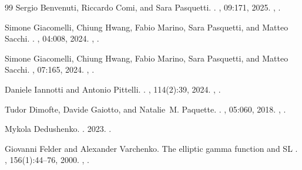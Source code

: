 \documentclass[11pt,a4paper]{article}
\makeatletter
\numberwithin{equation}{section}
\theoremstyle{plain}
\theoremstyle{definition}
\theoremstyle{remark}
\newcounter{mathrecordid}
\newcommand{\mathboxbegin}[1]{%
  \stepcounter{mathrecordid}%
  \immediate\write\mathrecords{\themathrecordid,#1}%
  \special{pdf:bann << /Type /Annot /Subtype /Link /Border [0 0 0]
    /MathBoxID \themathrecordid /F 2
    /A << /S /URI /URI (urn:mathbox:\themathrecordid) >> >>}}
\newcommand{\mathboxinlineplain}[1]{$#1$}
\newcommand{\mathboxinline}[1]{%
  $\mathboxbegin{inline}#1\special{pdf:eann}$}
\newcommand{\recordmath}{%
  \ifmeasuring@\expandafter\mathboxinlineplain
  \else\expandafter\mathboxinline\fi}
\makeatother
\begin{document}
\begin{thebibliography}{99}
Sergio Benvenuti, Riccardo Comi, and Sara Pasquetti.
.
, 09:171, 2025.
\newblock \href {https://arxiv.org/abs/2410.19049} {},
  \href {https://doi.org/10.1007/JHEP09(2025)171}
  {}.

Simone Giacomelli, Chiung Hwang, Fabio Marino, Sara Pasquetti, and Matteo
  Sacchi.
.
, 04:008, 2024.
\newblock \href {https://arxiv.org/abs/2309.05326} {},
  \href {https://doi.org/10.1007/JHEP04(2024)008}
  {}.

Simone Giacomelli, Chiung Hwang, Fabio Marino, Sara Pasquetti, and Matteo
  Sacchi.
, 07:165, 2024.
\newblock \href {https://arxiv.org/abs/2401.14456} {},
  \href {https://doi.org/10.1007/JHEP07(2024)165}
  {}.

Daniele Iannotti and Antonio Pittelli.
.
, 114(2):39, 2024.
\newblock \href {https://arxiv.org/abs/2307.11634} {},
  \href {https://doi.org/10.1007/s11005-024-01788-x}
  {}.

Tudor Dimofte, Davide Gaiotto, and Natalie~M. Paquette.
.
, 05:060, 2018.
\newblock \href {https://arxiv.org/abs/1712.07654} {},
  \href {https://doi.org/10.1007/JHEP05(2018)060}
  {}.

Mykola Dedushenko.
.
 2023.
\newblock \href {https://arxiv.org/abs/2312.17747} {}.

Giovanni Felder and Alexander Varchenko.
\newblock The elliptic gamma function and {SL}\recordmath{(3,\mathbb z)\ltimes \mathbb
  z^3}.
, 156(1):44--76, 2000.
\newblock \href {https://arxiv.org/abs/math/9907061}
  {}, \href {https://doi.org/10.1006/aima.2000.1942}
  {}.


\end{thebibliography}
\end{document}
